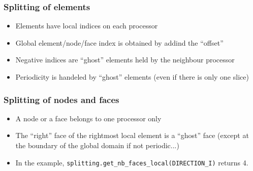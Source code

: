 \documentclass[10pt]{beamer}
\begin{document}
\begin{frame}[fragile]
\frametitle{Splitting of elements}
\begin{itemize}
  \item Elements have local indices on each processor
  \item Global element/node/face index is obtained by addind the ``offset''
  \item Negative indices are ``ghost'' elements held by the neighbour processor
  \item Periodicity is handeled by ``ghost'' elements (even if there is only one slice)
\end{itemize}
\end{frame}
\begin{frame}[fragile]
\frametitle{Splitting of nodes and faces}
\begin{itemize}
  \item A node or a face belongs to one processor only
  \item The ``right'' face of the rightmost local element is a ``ghost'' face (except at
the boundary of the global domain if not periodic...)
  \item In the example, \verb|splitting.get_nb_faces_local(DIRECTION_I)| returns 4.
\end{itemize}
\end{frame}
\end{document}
